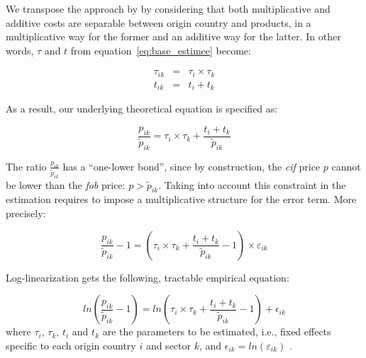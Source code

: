 \documentclass[a4paper,11pt]{article}
\begin{document}

We transpose the approach by \citet{Irrazabal_2015} by considering that both multiplicative and additive costs are separable between origin country and products, in a multiplicative way for the former and an additive way for the latter. In other words, $\tau$ and $t$ from equation~\ref{eq:base_estimee} become:


\begin{eqnarray}
\tau_{ik} &=& \tau_{i} \times \tau_{k} \label{eq:iceberg}\\
t_{ik} &=& t_{i} + t_{k} \label{eq:add}
\end{eqnarray}


As a result, our underlying theoretical equation is specified as:


\begin{equation}
\frac{p_{ik}}{\widetilde{p}_{ik}} =\tau_{i} \times \tau_{k}+\frac{t_{i} + t_{k}}{ \widetilde{p}_{ik}} \label{eq:theory_equation}
\end{equation}

The ratio $\frac{p_{ik}}{\widetilde{p}_{ik}}$ has a ``one-lower bond'', since by construction, the \emph{cif} price $p$ cannot be lower than the \emph{fob} price: $p>\widetilde{p}_{ik}$. Taking into account this constraint in the estimation requires to impose a multiplicative structure for the error term. More precisely:

\begin{equation}
\frac{p_{ik}}{\widetilde{p}_{ik}}-1 =\left(\tau_{i} \times \tau_{k}+\frac{t_{i} + t_{k}}{\widetilde{p}_{ik}}-1 \right)\times \varepsilon_{ik}
\end{equation}

Log-linearization gets the following, tractable empirical equation:

\begin{equation}
ln\left(\frac{p_{ik}}{\widetilde{p}_{ik}}-1 \right)= ln \left(\tau_{i} \times \tau_{k}+\frac{t_{i} + t_{k}}{\widetilde{p}_{ik}}-1 \right) + \epsilon_{ik} \label{eq:estimatedequation}
\end{equation}
where $\tau_{i}$, $\tau_{k}$, $t_{i}$ and $t_{k}$ are the parameters to be estimated, i.e., fixed effects specific to each origin country $i$ and sector $k$, and $\epsilon_{ik}= ln(\varepsilon_{ik})$ .
\end{document}
